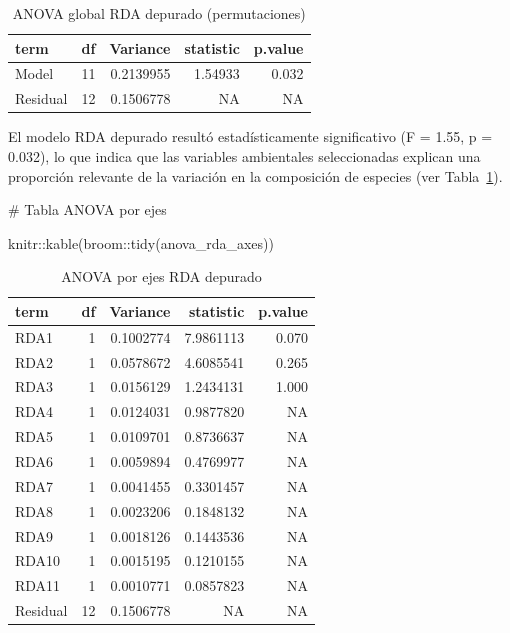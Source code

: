 \documentclass[
  spanish,
  11pt,
  a4paper,
  DIV=11,
  numbers=noendperiod]{scrartcl}
\newenvironment{Shaded}{\begin{snugshade}}{\end{snugshade}}
\newcommand{\CommentTok}[1]{\textcolor[rgb]{0.37,0.37,0.37}{#1}}
\newcommand{\FunctionTok}[1]{\textcolor[rgb]{0.28,0.35,0.67}{#1}}
\newcommand{\NormalTok}[1]{\textcolor[rgb]{0.00,0.23,0.31}{#1}}
\newcommand{\SpecialCharTok}[1]{\textcolor[rgb]{0.37,0.37,0.37}{#1}}
\begin{document}
\begin{longtable}[]{@{}lrrrr@{}}

\caption{\label{tbl-anova-global-rda}ANOVA global RDA depurado
(permutaciones)}

\tabularnewline

\toprule\noalign{}
term & df & Variance & statistic & p.value \\
\midrule\noalign{}
\endhead
\bottomrule\noalign{}
\endlastfoot
Model & 11 & 0.2139955 & 1.54933 & 0.032 \\
Residual & 12 & 0.1506778 & NA & NA \\

\end{longtable}

El modelo RDA depurado resultó estadísticamente significativo (F = 1.55,
p = 0.032), lo que indica que las variables ambientales seleccionadas
explican una proporción relevante de la variación en la composición de
especies (ver Tabla~\ref{tbl-anova-global-rda}).

\begin{Shaded}
\begin{Highlighting}[numbers=left,,]
\CommentTok{\# Tabla ANOVA por ejes}

\NormalTok{knitr}\SpecialCharTok{::}\FunctionTok{kable}\NormalTok{(broom}\SpecialCharTok{::}\FunctionTok{tidy}\NormalTok{(anova\_rda\_axes))}
\end{Highlighting}
\end{Shaded}

\begin{longtable}[]{@{}lrrrr@{}}

\caption{\label{tbl-anova-ejes-rda}ANOVA por ejes RDA depurado}

\tabularnewline

\toprule\noalign{}
term & df & Variance & statistic & p.value \\
\midrule\noalign{}
\endhead
\bottomrule\noalign{}
\endlastfoot
RDA1 & 1 & 0.1002774 & 7.9861113 & 0.070 \\
RDA2 & 1 & 0.0578672 & 4.6085541 & 0.265 \\
RDA3 & 1 & 0.0156129 & 1.2434131 & 1.000 \\
RDA4 & 1 & 0.0124031 & 0.9877820 & NA \\
RDA5 & 1 & 0.0109701 & 0.8736637 & NA \\
RDA6 & 1 & 0.0059894 & 0.4769977 & NA \\
RDA7 & 1 & 0.0041455 & 0.3301457 & NA \\
RDA8 & 1 & 0.0023206 & 0.1848132 & NA \\
RDA9 & 1 & 0.0018126 & 0.1443536 & NA \\
RDA10 & 1 & 0.0015195 & 0.1210155 & NA \\
RDA11 & 1 & 0.0010771 & 0.0857823 & NA \\
Residual & 12 & 0.1506778 & NA & NA \\

\end{longtable}
\end{document}
